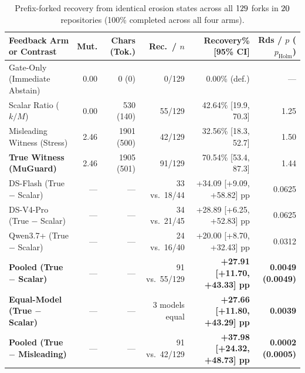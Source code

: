 \begin{table}[t]
\centering
\scriptsize
\setlength{\tabcolsep}{1.8pt}
\caption{Prefix-forked recovery from identical erosion states across all $129$ forks in $20$ repositories (100\% completed across all four arms).}
\label{tab:ablation}
\begin{tabular}{lrrrrr}
\toprule
Feedback Arm or Contrast & Mut. & Chars (Tok.) & Rec.\ / $n$ & Recovery\% [95\% CI] & Rds / $p$ ($p_{\text{Holm}}$) \\
\midrule
Gate-Only (Immediate Abstain) & 0.00 & 0 (0) & 0/129 & 0.00\% (def.) & --- \\
Scalar Ratio ($k/M$) & 0.00 & 530 (140) & 55/129 & 42.64\% [19.9, 70.3] & 1.25 \\
Misleading Witness (Stress) & 2.46 & 1901 (500) & 42/129 & 32.56\% [18.3, 52.7] & 1.50 \\
\textbf{True Witness (MuGuard)} & 2.46 & 1905 (501) & 91/129 & 70.54\% [53.4, 87.3] & 1.44 \\
\midrule
DS-Flash (True $-$ Scalar) & --- & --- & 33 vs.\ 18/44 & +34.09 [+9.09, +58.82] pp & 0.0625 \\
DS-V4-Pro (True $-$ Scalar) & --- & --- & 34 vs.\ 21/45 & +28.89 [+6.25, +52.83] pp & 0.0625 \\
Qwen3.7+ (True $-$ Scalar) & --- & --- & 24 vs.\ 16/40 & +20.00 [+8.70, +32.43] pp & 0.0312 \\
\midrule
\textbf{Pooled (True $-$ Scalar)} & --- & --- & 91 vs.\ 55/129 & \textbf{+27.91 [+11.70, +43.33] pp} & \textbf{0.0049 (0.0049)} \\
\textbf{Equal-Model (True $-$ Scalar)} & --- & --- & 3 models equal & \textbf{+27.66 [+11.80, +43.29] pp} & \textbf{0.0039} \\
\textbf{Pooled (True $-$ Misleading)} & --- & --- & 91 vs.\ 42/129 & \textbf{+37.98 [+24.32, +48.73] pp} & \textbf{0.0002 (0.0005)} \\
\bottomrule
\end{tabular}
\end{table}
